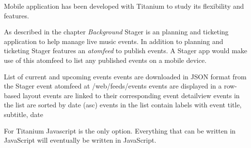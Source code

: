 Mobile application has been developed with Titanium to study its flexibility and features.

As described in the chapter \emph{Background} Stager is an planning and ticketing application to help manage live music events. In addition to planning and ticketing Stager features an \emph{atomfeed} to publish events. A Stager app would make use of this atomfeed to list any published events on a mobile device.


List of current and upcoming events
events are downloaded in JSON format from the Stager event atomfeed at /web/feeds/events
events are displayed in a row-based layout
events are linked to their corresponding event detailview
events in the list are sorted by date (asc)
events in the list contain labels with event title, subtitle, date


For Titanium Javascript is the only option. Everything that can be written in JavaScript will eventually be written in JavaScript.



